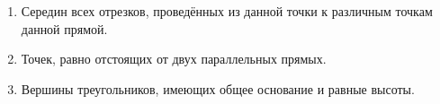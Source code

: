\documentclass[oneside]{book}
\begin{document}
\begin{center}
\end{center}

\begin{enumerate}


 \item
Середин всех отрезков, проведённых из данной точки к различным точкам данной прямой.

 \item
Точек, равно отстоящих от двух параллельных прямых.

 \item
Вершины треугольников, имеющих общее основание и равные высоты.
\end{enumerate}
\begin{center}
\end{center}
\end{document}
